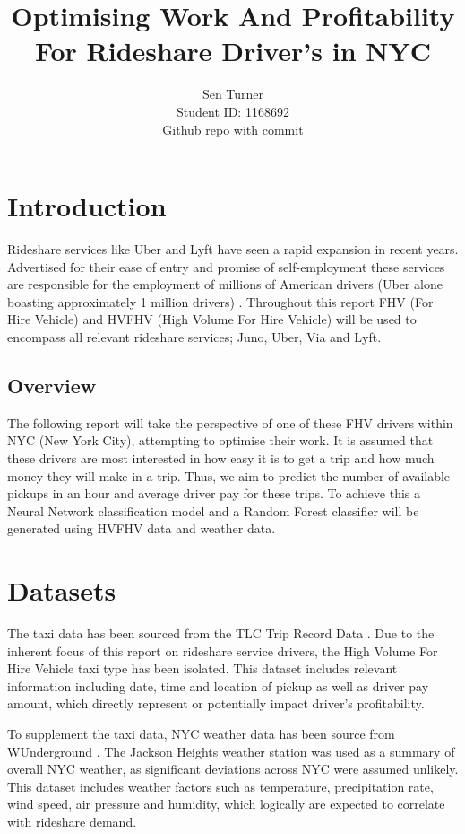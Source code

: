 \documentclass[11pt]{article}
\title{\textbf{Optimising Work And Profitability For Rideshare Driver's in NYC}}
\author{
Sen Turner \\
Student ID: 1168692 \\
\href{https://github.com/MAST30034-Applied-Data-Science/mast30034-project-1-senturner/tree/76afce757d46800c60b0037981d07bd6d73fd834}{Github repo with commit}
}
\begin{document}
\maketitle

\section{Introduction}

Rideshare services like Uber and Lyft have seen a rapid expansion in recent years. Advertised for their ease of entry and promise of self-employment these services are responsible for the employment of millions of American drivers (Uber alone boasting approximately 1 million drivers) \cite{uberdrivers}. Throughout this report FHV (For Hire Vehicle) and HVFHV (High Volume For Hire Vehicle) will be used to encompass all relevant rideshare services; Juno, Uber, Via and Lyft.

\subsection{Overview}

The following report will take the perspective of one of these FHV drivers within NYC (New York City), attempting to optimise their work. It is assumed that these drivers are most interested in how easy it is to get a trip and how much money they will make in a trip. Thus, we aim to predict the number of available pickups in an hour and average driver pay for these trips. To achieve this a Neural Network classification model and a Random Forest classifier will be generated using HVFHV data and weather data.  

\section{Datasets}

The taxi data has been sourced from the TLC Trip Record Data \cite{taxidata}. Due to the inherent focus of this report on rideshare service drivers, the High Volume For Hire Vehicle taxi type has been isolated. This dataset includes relevant information including date, time and location of pickup as well as driver pay amount, which directly represent or potentially impact driver's profitability.

To supplement the taxi data, NYC weather data has been source from WUnderground \cite{weatherdata}. The Jackson Heights weather station was used as a summary of overall NYC weather, as significant deviations across NYC were assumed unlikely. This dataset includes weather factors such as temperature, precipitation rate, wind speed, air pressure and humidity, which logically are expected to correlate with rideshare demand. 
\end{document}
